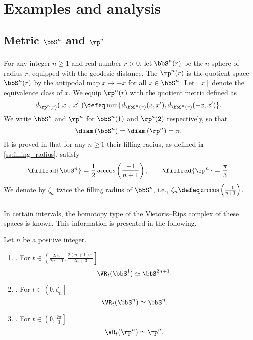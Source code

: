 
\section{Examples and analysis}\label{s:computations}

\subsection{Metric $\bbS^n$ and $\rp^n$}

\subsubsection{} For any integer $n \geq 1$ and real number $r > 0$, let $\bbS^n(r)$ be the $n$-sphere of radius $r$, equipped with the geodesic distance.
The  $\rp^n(r)$ is the quotient space $\bbS^n(r)$ by the antipodal map $x \mapsto -x$ for all $x \in \bbS^n$.
Let $[x]$ denote the equivalence class of $x$. We equip $\rp^n(r)$ with the quotient metric defined as
\[
d_{\rp^n(r)}([x],[x'])\defeq\min \{d_{\bbS^n(r)}(x,x'),d_{\bbS^n(r)}(-x,x')\}.
\]
We write $\bbS^n$ and $\rp^n$ for $\bbS^n(1)$ and $\rp^n(2)$ respectively, so that
\[
\diam \left(\bbS^n \right) = \diam\left(\rp^n \right) = \pi.
\]
It is proved in \cite{katz1983filling} that for any $n \geq 1$ their filling radius, as defined in \cref{ss:filling_radius}, satisfy
\[
\fillrad{\bbS^n} = \frac{1}{2}\arccos\left(\frac{-1}{n+1}\right), \qquad \fillrad{\rp^n}=\frac{\pi}{3}.
\]
We denote by $\zeta_n$ twice the filling radius of $\bbS^n$, i.e., $\zeta_n \defeq \arccos\left(\frac{-1}{n+1}\right)$.

\subsubsection{} In certain intervals, the homotopy type of the Vietoris--Rips complex of these spaces is known.
This information is presented in the following.

\begin{proposition}
	Let $n$ be a positive integer.
	\begin{enumerate}[{\rm (a)}]
		\item\label{prop:S1}{\rm \cite[Thm.~7.4]{adamaszek2017vietoris}.}
		For $t \in \left(\frac{2n\pi}{2n+1}, \frac{2(n+1)\pi}{2n+3}\right]$
		\[
		\VR_t(\bbS^1) \simeq \bbS^{2n+1}.
		\]

		\item\label{prop:Sn}{\rm \cite[Thm.~10]{lim2020vietoris}.}
		For $t \in \left(0, \zeta_n\right]$
		\[
		\VR_t(\bbS^n) \simeq \bbS^n.
		\]

		\item\label{prop:RPn}{\rm \cite[Thm.~4.5]{adams2022metric}.}
		For $t \in \left(0,\frac{2\pi}{3} \right]$
		\[
		\VR_t(\rp^n) \simeq \rp^n.
		\]
	\end{enumerate}
\end{proposition}

